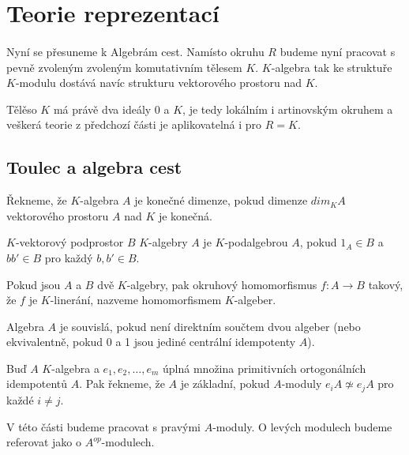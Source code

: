   \section{Teorie reprezentací}\label{teorie-reprezentaci}
  
    \paragraph{ }Nyní se přesuneme k Algebrám cest. Namísto 
    okruhu $R$ budeme nyní pracovat s pevně zvoleným zvoleným komutativním
    tělesem $K$. $K$-algebra tak ke struktuře $K$-modulu dostává 
    navíc strukturu vektorového prostoru nad  $K$.
    
    Tělěso $K$ má právě dva ideály $0$ a $K$, je tedy lokálním i artinovským okruhem 
    a veškerá teorie z předchozí části je aplikovatelná i pro $R=K$.
  
  \subsection{Toulec a algebra cest}
  
    \begin{dfn}
      Řekneme, že $K$-algebra $A$ je 
      konečné dimenze, pokud dimenze $dim_K A$ vektorového prostoru $A$
      nad $K$ je konečná. 
      
      $K$-vektorový podprostor $B$ $K$-algebry $A$ je $K$-podalgebrou $A$, pokud 
      $1_A\in B$ a $bb'\in B$ pro každý $b,b'\in B$. 
      
      Pokud jsou $A$ a $B$ dvě $K$-algebry, pak okruhový
      homomorfismus $f:A\rightarrow B$ takový, že $f$ je $K$-linerání, nazveme 
      homomorfismem $K$-algeber.
                      
      Algebra $A$ je souvislá, pokud není direktním součtem dvou algeber 
      (nebo ekvivalentně, pokud 0 a 1 jsou jediné centrální idempotenty $A$). 
    \end{dfn}  
    
    \begin{dfn}
      Buď $A$ $K$-algebra a ${e_1,e_2,\ldots,e_m}$ úplná množina primitivních 
      ortogonálních idempotentů $A$. Pak řekneme, že $A$ je základní, pokud $A$-moduly 
      $e_iA\not\simeq e_jA$ pro každé $i\neq j$.
    \end{dfn}
    
    V této části budeme pracovat s pravými $A$-moduly. O levých modulech budeme 
    referovat jako o $A^{op}$-modulech.
    
